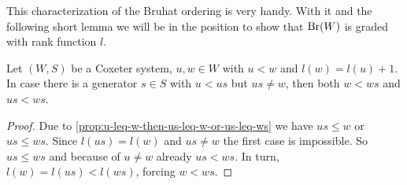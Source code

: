 This characterization of the Bruhat ordering is very handy. With it and the following short lemma we will be in the position to show that $\operatorname{Br}(W)$ is graded with rank function $l$.

\begin{lemm}
	Let $(W,S)$ be a Coxeter system, $u,w \in W$ with $u < w$ and $l(w) = l(u) + 1$. In case there is a generator $s \in S$ with $u < us$ but $us \neq w$, then both $w < ws$ and $us < ws$.

	\begin{proof}
		Due to \ref{prop:u-leq-w-then-us-leq-w-or-us-leq-ws} we have $us \leq w$ or $us \leq ws$. Since $l(us) = l(w)$ and $us \neq w$ the first case is impossible. So $us \leq ws$ and because of $u \neq w$ already $us < ws$. In turn, $l(w) = l(us) < l(ws)$, forcing $w < ws$.
	\end{proof}
\end{lemm}


